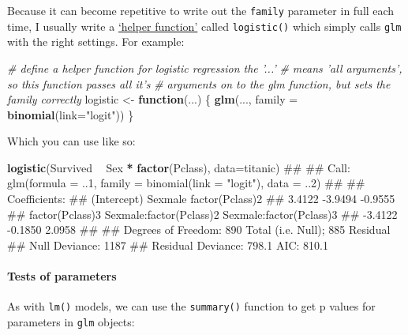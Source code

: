 \documentclass[]{article}
\newenvironment{Shaded}{\begin{snugshade}}{\end{snugshade}}
\newcommand{\KeywordTok}[1]{\textcolor[rgb]{0.13,0.29,0.53}{\textbf{#1}}}
\newcommand{\DataTypeTok}[1]{\textcolor[rgb]{0.13,0.29,0.53}{#1}}
\newcommand{\StringTok}[1]{\textcolor[rgb]{0.31,0.60,0.02}{#1}}
\newcommand{\CommentTok}[1]{\textcolor[rgb]{0.56,0.35,0.01}{\textit{#1}}}
\newcommand{\ControlFlowTok}[1]{\textcolor[rgb]{0.13,0.29,0.53}{\textbf{#1}}}
\newcommand{\OperatorTok}[1]{\textcolor[rgb]{0.81,0.36,0.00}{\textbf{#1}}}
\newcommand{\NormalTok}[1]{#1}
\let\oldparagraph\paragraph
\renewcommand{\paragraph}[1]{\oldparagraph{#1}\mbox{}}
\theoremstyle{definition}
\theoremstyle{definition}
\theoremstyle{definition}
\theoremstyle{remark}
\begin{document}
Because it can become repetitive to write out the \texttt{family}
parameter in full each time, I usually write a
\protect\hyperlink{helper-functions}{`helper function'} called
\texttt{logistic()} which simply calls \texttt{glm} with the right
settings. For example:

\begin{Shaded}
\begin{Highlighting}[]
\CommentTok{# define a helper function for logistic regression the '...' }
\CommentTok{# means 'all arguments', so this function passes all it's }
\CommentTok{# arguments on to the glm function, but sets the family correctly}
\NormalTok{logistic <-}\StringTok{ }\ControlFlowTok{function}\NormalTok{(...) \{}
  \KeywordTok{glm}\NormalTok{(..., }\DataTypeTok{family =} \KeywordTok{binomial}\NormalTok{(}\DataTypeTok{link=}\StringTok{"logit"}\NormalTok{))}
\NormalTok{\}}
\end{Highlighting}
\end{Shaded}

Which you can use like so:

\begin{Shaded}
\begin{Highlighting}[]
\KeywordTok{logistic}\NormalTok{(Survived }\OperatorTok{~}\StringTok{ }\NormalTok{Sex }\OperatorTok{*}\StringTok{ }\KeywordTok{factor}\NormalTok{(Pclass), }\DataTypeTok{data=}\NormalTok{titanic)}
\NormalTok{## }
\NormalTok{## Call:  glm(formula = ..1, family = binomial(link = "logit"), data = ..2)}
\NormalTok{## }
\NormalTok{## Coefficients:}
\NormalTok{##             (Intercept)                  Sexmale          factor(Pclass)2  }
\NormalTok{##                  3.4122                  -3.9494                  -0.9555  }
\NormalTok{##         factor(Pclass)3  Sexmale:factor(Pclass)2  Sexmale:factor(Pclass)3  }
\NormalTok{##                 -3.4122                  -0.1850                   2.0958  }
\NormalTok{## }
\NormalTok{## Degrees of Freedom: 890 Total (i.e. Null);  885 Residual}
\NormalTok{## Null Deviance:       1187 }
\NormalTok{## Residual Deviance: 798.1     AIC: 810.1}
\end{Highlighting}
\end{Shaded}

\paragraph{Tests of parameters}\label{tests-of-parameters}

As with \texttt{lm()} models, we can use the \texttt{summary()} function
to get p values for parameters in \texttt{glm} objects:
\end{document}

